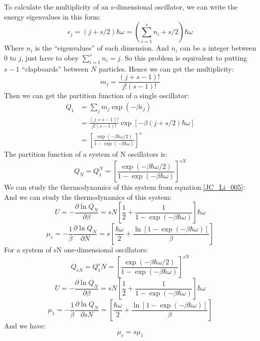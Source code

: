 \documentclass{article}
\begin{document}
    To calculate the multiplicity of an s-dimensional oscillator, we can write the energy eigenvalues in this form:
    \begin{equation}
        \epsilon_j=(j+s/2)\hbar \omega=(\sum_{i=1}^s n_i+s/2)\hbar \omega
    \end{equation}
    Where $n_i$ is the ``eigenvalues'' of each dimension. And $n_i$ can be a integer between $0$ to $j$, just have to obey $\sum_{i=1}^s n_i=j$. So this problem is equivalent to putting $s-1$ ``clapboards'' between $N$ particles. Hence we can get the multiplicity:
    \begin{equation}
        m_j=\frac{(j+s-1)!}{j!(s-1)!}
    \end{equation}
    Then we can get the partition function of a single oscillator:
    \begin{equation}
    \begin{aligned}
        Q_1&=\sum_j m_j \exp\left(-\beta \epsilon_j\right)\\
            &=\frac{(j+s-1)!}{j!(s-1)!}\exp\left[-\beta (j+s/2)\hbar \omega\right]\\
            &=\left[\frac{\exp (-\beta\hbar \omega/2)}{1-\exp (-\beta \hbar \omega)}\right]^s
    \end{aligned}
    \end{equation}
    The partition function of a system of N oscillators is:
    \begin{equation}
        Q_N=Q_1^N=\left[\frac{\exp (-\beta\hbar \omega/2)}{1-\exp (-\beta \hbar \omega)}\right]^{sN}
        \label{JC_Li_005}
    \end{equation}
    We can study the thermodynamics of this system from equation.\eqref{JC_Li_005}:
    And we can study the thermodynamics of this system:
    $$
        U = - \frac{\partial \ln Q_N}{\partial \beta}= sN\left[\frac{1}{2}+\frac{1}{1-\exp(-\beta \hbar \omega)}\right]\hbar\omega
    $$
    $$
        \mu_s = - \frac{1}{\beta}\frac{\partial \ln Q_N}{\partial N}= s\left[\frac{\hbar\omega}{2}+\frac{\ln [1-\exp(-\beta \hbar \omega)]}{\beta}\right]
    $$
    For a system of sN one-dimensional oscillators:
    $$
        Q_{sN}=Q_1^sN=\left[\frac{\exp (-\beta\hbar \omega/2)}{1-\exp (-\beta \hbar \omega)}\right]^{sN}
    $$
    $$
        U = - \frac{\partial \ln Q_N}{\partial \beta}= sN\left[\frac{1}{2}+\frac{1}{1-\exp(-\beta \hbar \omega)}\right]\hbar\omega
    $$
    $$
        \mu_1 = - \frac{1}{\beta}\frac{\partial \ln Q_N}{\partial sN}= \left[\frac{\hbar\omega}{2}+\frac{\ln [1-\exp(-\beta \hbar \omega)]}{\beta}\right]
    $$
    And we have:
    $$
        \mu_s=s\mu_1
    $$
\end{document}
